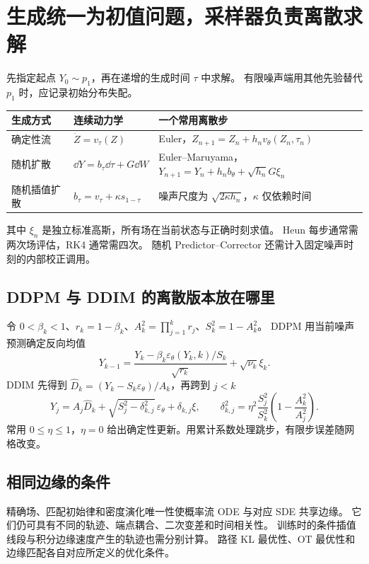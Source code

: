 \documentclass[language=chinese,margin=right,11pt]{lumenbook}
\begin{document}
\clearpage
\section*{生成统一为初值问题，采样器负责离散求解}

先指定起点 \(Y_0\sim p_1\)，再在递增的生成时间 \(\tau\) 中求解。
有限噪声端用其他先验替代 \(p_1\) 时，应记录初始分布失配。

\par\noindent
\begin{tabularx}{\textwidth}{@{}llX@{}}
\toprule
生成方式 & 连续动力学 & 一个常用离散步 \\
\midrule
确定性流 & \(\dot Z=v_\tau(Z)\) & Euler，\(Z_{n+1}=Z_n+h_nv_\theta(Z_n,\tau_n)\) \\
随机扩散 & \(\dd Y=b_\tau\dd\tau+G\dd W\) & Euler--Maruyama，\(Y_{n+1}=Y_n+h_nb_\theta+\sqrt{h_n}G\xi_n\) \\
随机插值扩散 & \(b_\tau=v_\tau+\kappa s_{1-\tau}\) & 噪声尺度为 \(\sqrt{2\kappa h_n}\)，\(\kappa\) 仅依赖时间 \\
\bottomrule
\end{tabularx}
其中 \(\xi_n\) 是独立标准高斯，所有场在当前状态与正确时刻求值。
Heun 每步通常需两次场评估，RK4 通常需四次。
随机 Predictor--Corrector 还需计入固定噪声时刻的内部校正调用。

\subsection*{DDPM 与 DDIM 的离散版本放在哪里}
令 \(0<\beta_k<1\)、\(r_k=1-\beta_k\)、\(A_k^2=\prod_{j=1}^kr_j\)、\(S_k^2=1-A_k^2\)。
DDPM 用当前噪声预测确定反向均值
\[
 Y_{k-1}=\frac{Y_k-\beta_k\varepsilon_\theta(Y_k,k)/S_k}{\sqrt{r_k}}
                  +\sqrt{\nu_k}\xi_k.
\]
DDIM 先得到 \(\widehat D_k=(Y_k-S_k\varepsilon_\theta)/A_k\)，再跨到 \(j<k\)
\[
 Y_j=A_j\widehat D_k+\sqrt{S_j^2-\delta_{k,j}^2}\,\varepsilon_\theta
                           +\delta_{k,j}\xi,
 \qquad
 \delta_{k,j}^2=\eta^2\frac{S_j^2}{S_k^2}\left(1-\frac{A_k^2}{A_j^2}\right).
\]
常用 \(0\le\eta\le1\)，\(\eta=0\) 给出确定性更新。用累计系数处理跳步，有限步误差随网格改变。

\subsection*{相同边缘的条件}
精确场、匹配初始律和密度演化唯一性使概率流 ODE 与对应 SDE 共享边缘。
它们仍可具有不同的轨迹、端点耦合、二次变差和时间相关性。
训练时的条件插值线段与积分边缘速度产生的轨迹也需分别计算。
路径 KL 最优性、OT 最优性和边缘匹配各自对应所定义的优化条件。
\end{document}
